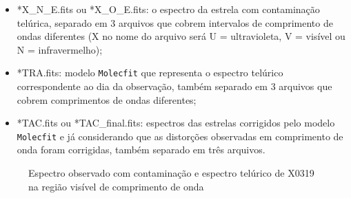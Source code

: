 \begin{itemize}
    \item *X\_N\_E.fits ou *X\_O\_E.fits: o espectro da estrela com contaminação telúrica, separado em 3 arquivos que cobrem intervalos de comprimento de ondas diferentes (X no nome do arquivo será U = ultravioleta, V = visível ou N = infravermelho);
    \item *TRA.fits: modelo \texttt{Molecfit} que representa o espectro telúrico correspondente ao dia da observação, também separado em 3 arquivos que cobrem comprimentos de ondas diferentes;
    \item *TAC.fits ou *TAC\_final.fits: espectros das estrelas corrigidos pelo modelo \texttt{Molecfit} e já considerando que as distorções observadas em comprimento de onda foram corrigidas, também separado em três arquivos.
\end{itemize}


\begin{figure}[htb]
  \centering
  \hfill
  \caption{Espectro observado com contaminação e espectro telúrico de X0319 na região visível de comprimento de onda}
  \label{fig:x0319-visible}
\end{figure}


